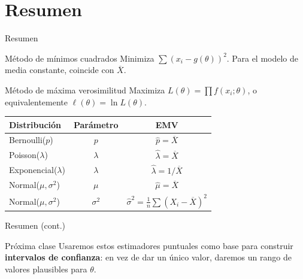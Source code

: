 \documentclass[aspectratio=169,11pt]{beamer}
\begin{document}
\section{Resumen}

\begin{frame}{Resumen}
\begin{block}{Método de mínimos cuadrados}
Minimiza $\sum (x_i - g(\theta))^2$. Para el modelo de media constante, coincide con $\overline X$.
\end{block}

\begin{block}{Método de máxima verosimilitud}
Maximiza $L(\theta)=\prod f(x_i;\theta)$, o equivalentemente $\ell(\theta)=\ln L(\theta)$.
\end{block}

\begin{center}
\begin{tabular}{lcc}
\toprule
\textbf{Distribución} & \textbf{Parámetro} & \textbf{EMV} \\
\midrule
Bernoulli($p$) & $p$ & $\widehat p = \overline X$ \\
Poisson($\lambda$) & $\lambda$ & $\widehat\lambda = \overline X$ \\
Exponencial($\lambda$) & $\lambda$ & $\widehat\lambda = 1/\overline X$ \\
Normal($\mu,\sigma^2$) & $\mu$ & $\widehat\mu = \overline X$ \\
Normal($\mu,\sigma^2$) & $\sigma^2$ & $\widehat\sigma^2 = \frac{1}{n}\sum(X_i-\overline X)^2$ \\
\bottomrule
\end{tabular}
\end{center}

\end{frame}

\begin{frame}{Resumen (cont.)}
\begin{alertblock}{Próxima clase}
Usaremos estos estimadores puntuales como base para construir \textbf{intervalos de confianza}: en vez de dar un único valor, daremos un rango de valores plausibles para $\theta$.
\end{alertblock}
\end{frame}
\end{document}
